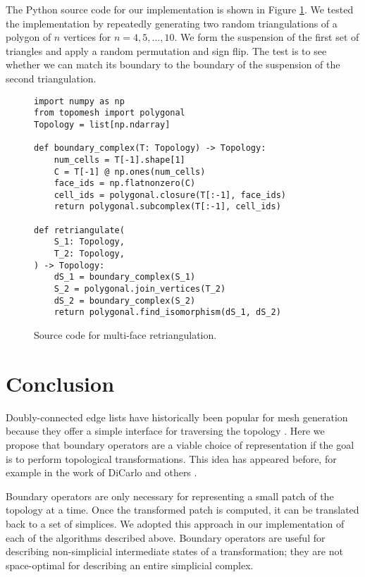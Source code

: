 \documentclass[twocolumn]{article}
\begin{document}
The Python source code for our implementation is shown in Figure \ref{fig:mfrt-code}.
We tested the implementation by repeatedly generating two random triangulations of a polygon of $n$ vertices for $n = 4, 5, \ldots, 10$.
We form the suspension of the first set of triangles and apply a random permutation and sign flip.
The test is to see whether we can match its boundary to the boundary of the suspension of the second triangulation.

\begin{figure}[t]
\begin{verbatim}
import numpy as np
from topomesh import polygonal
Topology = list[np.ndarray]

def boundary_complex(T: Topology) -> Topology:
    num_cells = T[-1].shape[1]
    C = T[-1] @ np.ones(num_cells)
    face_ids = np.flatnonzero(C)
    cell_ids = polygonal.closure(T[:-1], face_ids)
    return polygonal.subcomplex(T[:-1], cell_ids)

def retriangulate(
    S_1: Topology,
    T_2: Topology,
) -> Topology:
    dS_1 = boundary_complex(S_1)
    S_2 = polygonal.join_vertices(T_2)
    dS_2 = boundary_complex(S_2)
    return polygonal.find_isomorphism(dS_1, dS_2)
\end{verbatim}
    \caption{Source code for multi-face retriangulation.}
\label{fig:mfrt-code}
\end{figure}


\section{Conclusion}

Doubly-connected edge lists have historically been popular for mesh generation because they offer a simple interface for traversing the topology \cite{guibas1985primitives}.
Here we propose that boundary operators are a viable choice of representation if the goal is to perform topological transformations.
This idea has appeared before, for example in the work of DiCarlo and others \cite{dicarlo2007solid}.

Boundary operators are only necessary for representing a small patch of the topology at a time.
Once the transformed patch is computed, it can be translated back to a set of simplices.
We adopted this approach in our implementation of each of the algorithms described above.
Boundary operators are useful for describing non-simplicial intermediate states of a transformation; they are not space-optimal for describing an entire simplicial complex.
\end{document}
